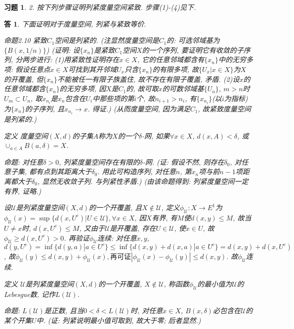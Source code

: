 \documentclass{ctexart}%
\newtheorem*{exercise}{习题}
\newtheorem*{solution}{答}
\theoremstyle{definition}
\theoremstyle{remark}
\begin{document}
\begin{exercise}2. 按下列步骤证明列紧度量空间紧致. 步骤(1)-(4)见下. 
\end{exercise}
\begin{solution}
下面证明对于度量空间, 列紧与紧致等价.

命题2.10 紧致$C_1$空间是列紧的. (注显然度量空间是$C_1$的: 可选邻域基为$\{B(x,1/n)\}$) (证明: 设$\{x_n\}$是紧致$C_1$空间$X$的一个序列, 要证明它有收敛的子序列, 分两步进行: (1)用紧致性证明存在$x\in X$, 它的任意邻域都含有$\{x_n\}$中的无穷多项: 假设任意点$x\in X$可找到其开邻域$U_x$只含$\{x_n\}$的有限多项, 故$\{U_x|x\in X\}$为$X$的开覆盖, 但$\{x_n\}$不能被任一有限子族盖住, 故不存在有限子覆盖, 矛盾. (2)设$x$的任意邻域都含$\{x_n\}$的无穷多项, 因$X$是$C_1$的, 故可取$x$的可数邻域基$\{U_n\}$, $m>n$时$U_m\subset U_n$, 取$x_{n_i}$是$x_n$包含在$U_i$中那些项的第$i$个, 故$n_{i+1}>n_i$, 有$\{x_{n_i}\}$(以$i$为指标)为$\{x_n\}$的子序列, 且$x_{n_i}\rightarrow x$. 得证.) (从而度量空间, 因为满足$C_1$, 故紧致度量空间是列紧的.)

定义 度量空间$(X,d)$的子集$A$称为$X$的一个$\delta$-网, 如果$\forall x\in X$, $d(x, A)<\delta$, 或$\cup_{a\in A}B(a,\delta)=X$. 

命题: 对任意$\delta>0$, 列紧度量空间存在有限的$\delta$-网. (证: 假设不然, 则存在$\delta_0$, 对任意子集, 都有点到其距离大于$\delta_0$. 用此可构造序列, 对任意$n$, 第$x_n$项与前$n-1$项距离都大于$\delta_0$, 显然无收敛子列. 与列紧性矛盾.) (由该命题得到: 列紧度量空间一定有界, 证略.) 

设$\mathscr{U}$是列紧度量空间$(X,d)$的一个开覆盖, 且$X\notin \mathscr{U}$, 定义$\phi_{\mathscr{U}}: X\rightarrow E^1$为 $\phi_{\mathscr{U}}(x)=\sup \{d(x,U^c)|U\in \mathscr{U}\}, \forall x\in X$, 因$X$有界, 有$M$使$d(x,y)\leq M$, 故当$U\neq x$时, $d(x,U^c)\leq M$, 又由于$\mathscr{U}$是开覆盖, 存在$U\in \mathscr{U}$, 使$x\in U$, 故$\phi_{\mathscr{U}}\geq d(x,U^c)>0$. 再验证$\phi_{\mathscr{U}}$连续: 对任意$x, y$, $d(y, U^c)=\inf\{d(y,a)|a\in U^c\}\leq \inf \{d(x,y)+d(x,a)|a\in U^c\}=d(x,y)+d(x,U^c)$, 故$\phi_{\mathscr{U}}(y)\leq d(x,y)+\phi_{\mathscr{U}}(x), 再可证|\phi_{\mathscr{U}}(x)-\phi_{\mathscr{U}}(y)|\leq d(x,y)$. 故$\phi_{\mathscr{U}}$连续. 

定义 $\mathscr{U}$是列紧度量空间$(X,d)$的一个开覆盖, $X\notin \mathscr{U}$, 称函数$\phi_{\mathscr{U}}$的最小值为$\mathscr{U}$的Lebesgue数, 记作$L(\mathscr{U})$. 

命题: $L(\mathscr{U})$是正数, 且当$0<\delta<L(\mathscr{U})$时, 对任意$x\in X$, $B(x,\delta)$必包含在$\mathscr{U}$的某个开集$U$中. (证: 列紧说明最小值可取到, 故大于零; 后者显然.)


\end{solution}
\end{document}
